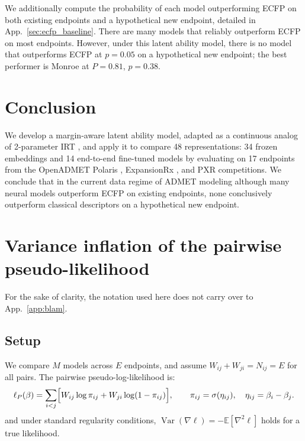 \documentclass{article}
\DeclareMathOperator{\Var}{Var}
\begin{document}
We additionally compute the probability of each model outperforming ECFP on both existing endpoints and a hypothetical new endpoint, detailed in App.~\ref{sec:ecfp_baseline}. There are many models that reliably outperform ECFP on most endpoints. However, under this latent ability model, there is no model that outperforms ECFP at $p = 0.05$ on a hypothetical new endpoint; the best performer is Monroe \citep{monroe} at $P = 0.81$, $p = 0.38$.


\section{Conclusion}
We develop a margin-aware latent ability model, adapted as a continuous analog of 2-parameter IRT \citep{lord1968, birnbaum1968}, and apply it to compare 48 representations: 34 frozen embeddings and 14 end-to-end fine-tuned models by evaluating on 17 endpoints from the OpenADMET Polaris \citep{asap2025, polaris}, ExpansionRx \citep{expansionrx}, and PXR \citep{pxr} competitions. We conclude that in the current data regime of ADMET modeling although many neural models outperform ECFP on existing endpoints, none conclusively outperform classical descriptors on a hypothetical new endpoint.





\appendix

\section{Variance inflation of the pairwise pseudo-likelihood}
\label{app:inflation}

For the sake of clarity, the notation used here does not carry over to App.~\ref{app:blam}.

\subsection{Setup}
We compare $M$ models across $E$ endpoints, and assume $W_{ij} + W_{ji} = N_{ij} = E$ for all pairs. The pairwise pseudo-log-likelihood is:
\begin{equation}
  \ell_P(\beta) = \sum_{i<j}\Bigl[ W_{ij}\log \pi_{ij} + W_{ji}\log(1 - \pi_{ij}) \Bigr],
  \qquad \pi_{ij} = \sigma(\eta_{ij}), \quad \eta_{ij} = \beta_i - \beta_j .
\end{equation} and under standard regularity conditions, $\Var(\nabla \ell) = -\mathbb{E}[\nabla^2 \ell]$ holds for a true likelihood.
\end{document}
